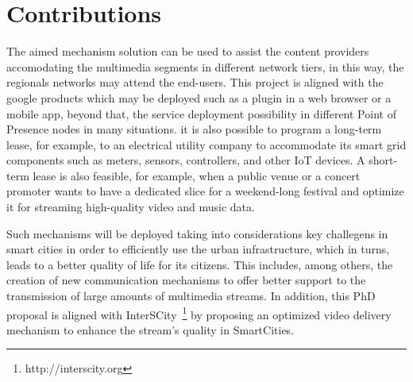 \section{Contributions}
\label{sec:contributions}



The aimed mechanism solution can be used to assist the content providers accomodating the multimedia segments in different network tiers, in this way, the regionals networks may attend the end-users. This project is aligned with the google products which may be deployed such as a plugin in a web browser or a mobile app, beyond that, the service deployment possibility in different Point of Presence nodes in many situations. it is also possible to program a long-term lease, for example, to an electrical utility company to accommodate its smart grid components such as meters, sensors, controllers, and other IoT devices. A short-term lease is also feasible, for example, when a public venue or a concert promoter wants to have a dedicated slice for a weekend-long festival and optimize it for streaming high-quality video and music data.

 Such mechanisms will be deployed taking into considerations key challegens in smart cities in order to efficiently use the urban infrastructure, which in turns, leads to a better quality of life for its citizens. 
This includes, among others, the creation of new communication mechanisms to offer better support to the transmission of large amounts of multimedia streams. %
In addition, this PhD proposal is aligned with InterSCity~\footnote{http://interscity.org} by proposing an optimized video delivery mechanism to enhance the stream’s quality in SmartCities.



